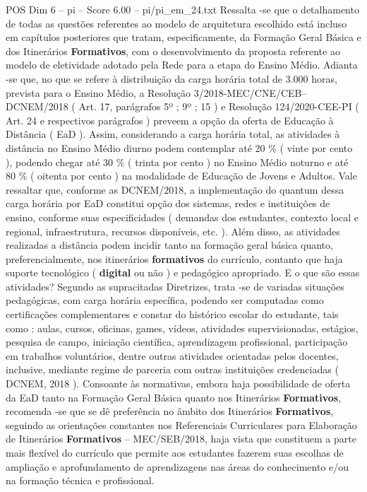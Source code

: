 \begin{textsample}{POS Dim 6 – pi – Score 6.00 – pi/pi\_em\_24.txt}
Ressalta -se que o detalhamento de todas as questões referentes ao modelo de arquitetura escolhido está incluso em capítulos posteriores que tratam, especificamente, da Formação Geral Básica e dos Itinerários \textbf{Formativos}, com o desenvolvimento da proposta referente ao modelo de eletividade adotado pela Rede para a etapa do Ensino Médio.
Adianta -se que, no que se refere à distribuição da carga horária total de 3.000 horas, prevista para o Ensino Médio, a Resolução 3/2018-MEC/CNE/CEB–DCNEM/2018 ( Art. 17, parágrafos 5º ; 9º ; 15 ) e Resolução 124/2020-CEE-PI ( Art. 24 e respectivos parágrafos ) preveem a opção da oferta de Educação à Distância ( EaD ).
Assim, considerando a carga horária total, as atividades à distância no Ensino Médio diurno podem contemplar até 20 \% ( vinte por cento ), podendo chegar até 30 \% ( trinta por cento ) no Ensino Médio noturno e até 80 \% ( oitenta por cento ) na modalidade de Educação de Jovens e Adultos.
Vale ressaltar que, conforme as DCNEM/2018, a implementação do quantum dessa carga horária por EaD constitui opção dos sistemas, redes e instituições de ensino, conforme suas especificidades ( demandas dos estudantes, contexto local e regional, infraestrutura, recursos disponíveis, etc. ).
Além disso, as atividades realizadas a distância podem incidir tanto na formação geral básica quanto, preferencialmente, nos itinerários \textbf{formativos} do currículo, contanto que haja suporte tecnológico ( \textbf{digital} ou não ) e pedagógico apropriado.
E o que são essas atividades?
Segundo as supracitadas Diretrizes, trata -se de variadas situações pedagógicas, com carga horária específica, podendo ser computadas como certificações complementares e constar do histórico escolar do estudante, tais como : aulas, cursos, oficinas, games, vídeos, atividades supervisionadas, estágios, pesquisa de campo, iniciação científica, aprendizagem profissional, participação em trabalhos voluntários, dentre outras atividades orientadas pelos docentes, inclusive, mediante regime de parceria com outras instituições credenciadas ( DCNEM, 2018 ).
Consoante às normativas, embora haja possibilidade de oferta da EaD tanto na Formação Geral Básica quanto nos Itinerários \textbf{Formativos}, recomenda -se que se dê preferência no âmbito dos Itinerários \textbf{Formativos}, seguindo as orientações constantes nos Referenciais Curriculares para Elaboração de Itinerários \textbf{Formativos} – MEC/SEB/2018, haja vista que constituem a parte mais flexível do currículo que permite aos estudantes fazerem suas escolhas de ampliação e aprofundamento de aprendizagens nas áreas do conhecimento e/ou na formação técnica e profissional.

\end{textsample}
